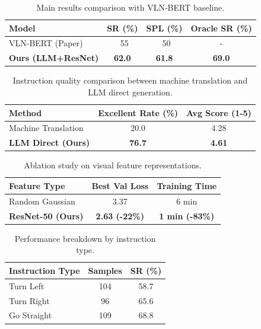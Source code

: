 
\begin{table}[t]
\centering
\begin{tabular}{lccc}
\hline
\textbf{Model} & \textbf{SR (\%)} & \textbf{SPL (\%)} & \textbf{Oracle SR (\%)} \\
\hline
VLN-BERT (Paper) & ~55 & ~50 & - \\
\textbf{Ours (LLM+ResNet)} & \textbf{62.0} & \textbf{61.8} & \textbf{69.0} \\
\hline
\end{tabular}
\caption{Main results comparison with VLN-BERT baseline.}
\label{tab:main_results}
\end{table}

\begin{table}[t]
\centering
\begin{tabular}{lcc}
\hline
\textbf{Method} & \textbf{Excellent Rate (\%)} & \textbf{Avg Score (1-5)} \\
\hline
Machine Translation & 20.0 & 4.28 \\
\textbf{LLM Direct (Ours)} & \textbf{76.7} & \textbf{4.61} \\
\hline
\end{tabular}
\caption{Instruction quality comparison between machine translation and LLM direct generation.}
\label{tab:instruction_quality}
\end{table}

\begin{table}[t]
\centering
\begin{tabular}{lcc}
\hline
\textbf{Feature Type} & \textbf{Best Val Loss} & \textbf{Training Time} \\
\hline
Random Gaussian & 3.37 & 6 min \\
\textbf{ResNet-50 (Ours)} & \textbf{2.63 (-22\%)} & \textbf{1 min (-83\%)} \\
\hline
\end{tabular}
\caption{Ablation study on visual feature representations.}
\label{tab:feature_ablation}
\end{table}

\begin{table}[t]
\centering
\begin{tabular}{lcc}
\hline
\textbf{Instruction Type} & \textbf{Samples} & \textbf{SR (\%)} \\
\hline
Turn Left & 104 & 58.7 \\
Turn Right & 96 & 65.6 \\
Go Straight & 109 & 68.8 \\
\hline
\end{tabular}
\caption{Performance breakdown by instruction type.}
\label{tab:instruction_type}
\end{table}

